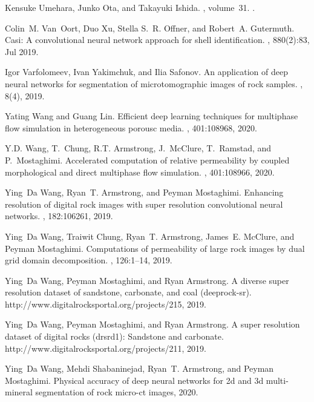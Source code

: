 \documentclass{article}
\begin{document}
\begin{thebibliography}{10}
Kensuke Umehara, Junko Ota, and Takayuki Ishida.
, volume~31.
.

Colin~M. Van~Oort, Duo Xu, Stella S.~R. Offner, and Robert~A. Gutermuth.
\newblock Casi: A convolutional neural network approach for shell
  identification.
, 880(2):83, Jul 2019.

Igor Varfolomeev, Ivan Yakimchuk, and Ilia Safonov.
\newblock An application of deep neural networks for segmentation of
  microtomographic images of rock samples.
, 8(4), 2019.

Yating Wang and Guang Lin.
\newblock Efficient deep learning techniques for multiphase flow simulation in
  heterogeneous porousc media.
, 401:108968, 2020.

Y.D. Wang, T.~Chung, R.T. Armstrong, J.~McClure, T.~Ramstad, and P.~Mostaghimi.
\newblock Accelerated computation of relative permeability by coupled
  morphological and direct multiphase flow simulation.
, 401:108966, 2020.

Ying~Da Wang, Ryan~T. Armstrong, and Peyman Mostaghimi.
\newblock Enhancing resolution of digital rock images with super resolution
  convolutional neural networks.
, 182:106261, 2019.

Ying~Da Wang, Traiwit Chung, Ryan~T. Armstrong, James~E. McClure, and Peyman
  Mostaghimi.
\newblock Computations of permeability of large rock images by dual grid domain
  decomposition.
, 126:1--14, 2019.

Ying~Da Wang, Peyman Mostaghimi, and Ryan Armstrong.
\newblock A diverse super resolution dataset of sandstone, carbonate, and coal
  (deeprock-sr).
\newblock http://www.digitalrocksportal.org/projects/215, 2019.

Ying~Da Wang, Peyman Mostaghimi, and Ryan Armstrong.
\newblock A super resolution dataset of digital rocks (drsrd1): Sandstone and
  carbonate.
\newblock http://www.digitalrocksportal.org/projects/211, 2019.

Ying~Da Wang, Mehdi Shabaninejad, Ryan~T. Armstrong, and Peyman Mostaghimi.
\newblock Physical accuracy of deep neural networks for 2d and 3d multi-mineral
  segmentation of rock micro-ct images, 2020.


\end{thebibliography}
\end{document}
